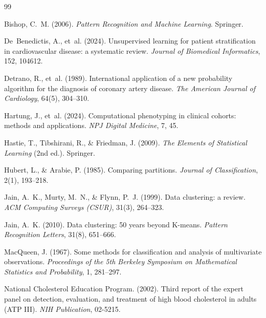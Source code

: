 \documentclass[twocolumn, fontsize=10pt]{article}
\begin{document}

\begin{thebibliography}{99}


Bishop, C.~M. (2006).
\newblock \textit{Pattern Recognition and Machine Learning}.
\newblock Springer.

De~Benedictis, A., et~al. (2024).
\newblock Unsupervised learning for patient stratification in cardiovascular
disease: a systematic review.
\newblock \textit{Journal of Biomedical Informatics}, 152, 104612.

Detrano, R., et~al. (1989).
\newblock International application of a new probability algorithm for the
diagnosis of coronary artery disease.
\newblock \textit{The American Journal of Cardiology}, 64(5), 304--310.

Hartung, J., et~al. (2024).
\newblock Computational phenotyping in clinical cohorts: methods and applications.
\newblock \textit{NPJ Digital Medicine}, 7, 45.

Hastie, T., Tibshirani, R., \& Friedman, J. (2009).
\newblock \textit{The Elements of Statistical Learning} (2nd ed.).
\newblock Springer.

Hubert, L., \& Arabie, P. (1985).
\newblock Comparing partitions.
\newblock \textit{Journal of Classification}, 2(1), 193--218.

Jain, A.~K., Murty, M.~N., \& Flynn, P.~J. (1999).
\newblock Data clustering: a review.
\newblock \textit{ACM Computing Surveys (CSUR)}, 31(3), 264--323.

Jain, A.~K. (2010).
\newblock Data clustering: 50 years beyond K-means.
\newblock \textit{Pattern Recognition Letters}, 31(8), 651--666.

MacQueen, J. (1967).
\newblock Some methods for classification and analysis of multivariate
observations.
\newblock \textit{Proceedings of the 5th Berkeley Symposium on Mathematical
Statistics and Probability}, 1, 281--297.

National Cholesterol Education Program. (2002).
\newblock Third report of the expert panel on detection, evaluation, and
treatment of high blood cholesterol in adults (ATP III).
\newblock \textit{NIH Publication}, 02-5215.


\end{thebibliography}
\end{document}
